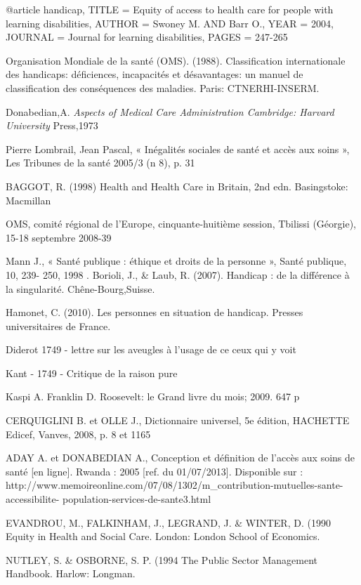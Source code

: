 

@article {handicap,
 TITLE = {Equity of access to health care for people with learning disabilities},
 AUTHOR = {Swoney M. AND Barr O.},
 YEAR = {2004}, 
 JOURNAL = {Journal for learning disabilities}, 
 PAGES = {247-265}}


Organisation Mondiale de la santé (OMS). (1988). Classification internationale des handicaps: déficiences, incapacités et désavantages: un manuel de classification des conséquences des maladies. Paris: CTNERHI-INSERM.


Donabedian,A. \textit{Aspects of Medical Care Administration Cambridge: Harvard University} Press,1973

Pierre Lombrail, Jean Pascal, « Inégalités sociales de santé et accès aux soins », Les Tribunes de la santé 2005/3 (n 8), p. 31

BAGGOT, R. (1998) Health and Health Care in Britain, 2nd edn. Basingstoke: Macmillan

OMS, comité régional de l’Europe, cinquante-huitième session, Tbilissi (Géorgie), 15-18 septembre 2008-39

 Mann J., « Santé publique : éthique et  droits de la personne », Santé publique, 10, 239- 250, 1998
 .
 Borioli, J., & Laub, R. (2007). Handicap : de la différence à la singularité. Chêne-Bourg,Suisse.

Hamonet, C. (2010). Les personnes en situation de handicap. Presses universitaires de France.

Diderot 1749 - lettre sur les aveugles à l'usage de ce ceux qui y voit

Kant - 1749 - Critique de la raison pure

Kaspi A. Franklin D. Roosevelt: le Grand livre du mois; 2009. 647 p

CERQUIGLINI B. et OLLE J., Dictionnaire universel, 5e édition, HACHETTE Edicef, Vanves, 2008, p. 8 et 1165

ADAY A. et DONABEDIAN A., Conception et définition de l'accès aux soins de santé [en ligne]. Rwanda : 2005 [ref. du 01/07/2013]. Disponible sur : http://www.memoireonline.com/07/08/1302/m_contribution-mutuelles-sante-accessibilite- population-services-de-sante3.html 

EVANDROU, M., FALKINHAM, J., LEGRAND, J. & WINTER, D. (1990 Equity in Health and Social Care. London: London School of Economics.

NUTLEY, S. & OSBORNE, S. P. (1994 The Public Sector Management Handbook. Harlow: Longman.

